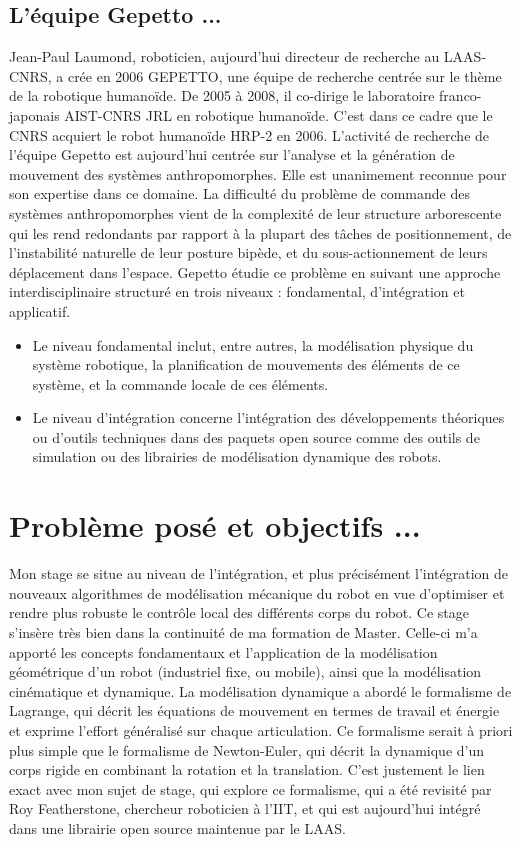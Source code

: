 \documentclass{report}
\begin{document}
\subsection*{L'équipe Gepetto ...}
Jean-Paul Laumond, roboticien, aujourd'hui directeur de recherche au LAAS-CNRS, a crée en 2006 GEPETTO, une équipe de recherche centrée sur le thème de la robotique humanoïde. De 2005 à 2008, il co-dirige le laboratoire franco-japonais AIST-CNRS JRL en robotique humanoïde. C’est dans ce cadre que le CNRS acquiert le robot humanoïde HRP-2 en 2006. L’activité de recherche de l’équipe Gepetto est aujourd'hui centrée sur l’analyse et la génération de mouvement des systèmes anthropomorphes. Elle est unanimement reconnue pour son expertise dans ce domaine. La difficulté du problème de commande des systèmes anthropomorphes vient de la complexité de leur structure arborescente qui les rend redondants par rapport à la plupart des tâches de positionnement, de l’instabilité naturelle de leur posture bipède, et du sous-actionnement de leurs déplacement dans l’espace. Gepetto étudie ce problème en suivant une approche interdisciplinaire structuré en trois niveaux :  fondamental,  d'intégration et applicatif.
\begin{itemize}
\item Le niveau fondamental inclut, entre autres, la modélisation physique du système robotique, la planification de mouvements des éléments de ce système, et la commande locale de ces éléments.
\item Le niveau d'intégration concerne l'intégration des développements théoriques ou d'outils techniques dans des paquets open source comme des outils de simulation ou des librairies de modélisation dynamique des robots.
\end{itemize}

\section*{Problème posé et objectifs ...}

Mon stage se situe au niveau de l'intégration, et plus précisément l'intégration de nouveaux algorithmes de modélisation mécanique du robot en vue d'optimiser et rendre plus robuste le contrôle local des différents corps du robot. Ce stage s'insère très bien dans la continuité de ma formation de Master. Celle-ci m'a apporté les concepts fondamentaux et l'application de la modélisation géométrique d'un robot (industriel fixe, ou mobile), ainsi que la modélisation cinématique et dynamique. La modélisation dynamique a abordé le formalisme de Lagrange, qui décrit les équations de mouvement en termes de travail et énergie et exprime l'effort généralisé sur chaque articulation. Ce formalisme serait à priori plus simple que le formalisme de Newton-Euler, qui décrit la dynamique d'un corps rigide en combinant la rotation et la translation. C'est justement le lien exact avec mon sujet de stage, qui explore ce formalisme, qui a été revisité par Roy Featherstone, chercheur roboticien à l'IIT, et qui est aujourd'hui intégré dans une librairie open source maintenue par le LAAS.
\end{document}

